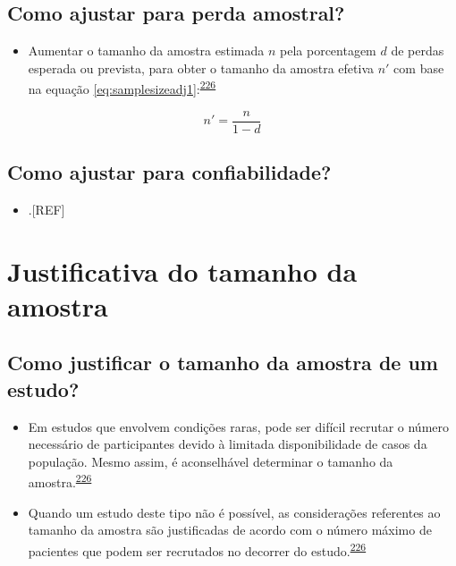 \documentclass[
  a4paper,
]{book}
\providecommand{\tightlist}{%
  \setlength{\itemsep}{0pt}\setlength{\parskip}{0pt}}
\begin{document}
\hypertarget{como-ajustar-para-perda-amostral}{%
\subsection{Como ajustar para perda amostral?}\label{como-ajustar-para-perda-amostral}}

\begin{itemize}
\tightlist
\item
  Aumentar o tamanho da amostra estimada \(n\) pela porcentagem \(d\) de perdas esperada ou prevista, para obter o tamanho da amostra efetiva \(n'\) com base na equação \eqref{eq:samplesizeadj1}:\textsuperscript{\protect\hyperlink{ref-rodruxedguezdeluxe1guila2014}{226}}
\end{itemize}

\begin{equation}
\label{eq:samplesizeadj1}
n' = \dfrac{n}{1-d}
\end{equation}

\hypertarget{como-ajustar-para-confiabilidade}{%
\subsection{Como ajustar para confiabilidade?}\label{como-ajustar-para-confiabilidade}}

\begin{itemize}
\tightlist
\item
  .{[}REF{]}
\end{itemize}

\hypertarget{justificativa-do-tamanho-da-amostra}{%
\section{Justificativa do tamanho da amostra}\label{justificativa-do-tamanho-da-amostra}}

\hypertarget{como-justificar-o-tamanho-da-amostra-de-um-estudo}{%
\subsection{Como justificar o tamanho da amostra de um estudo?}\label{como-justificar-o-tamanho-da-amostra-de-um-estudo}}

\begin{itemize}
\item
  Em estudos que envolvem condições raras, pode ser difícil recrutar o número necessário de participantes devido à limitada disponibilidade de casos da população. Mesmo assim, é aconselhável determinar o tamanho da amostra.\textsuperscript{\protect\hyperlink{ref-rodruxedguezdeluxe1guila2014}{226}}
\item
  Quando um estudo deste tipo não é possível, as considerações referentes ao tamanho da amostra são justificadas de acordo com o número máximo de pacientes que podem ser recrutados no decorrer do estudo.\textsuperscript{\protect\hyperlink{ref-rodruxedguezdeluxe1guila2014}{226}}
\end{itemize}
\end{document}
